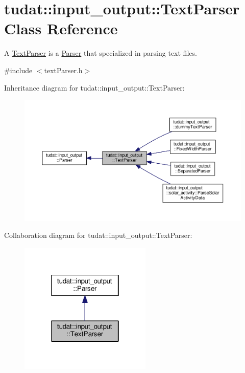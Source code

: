 \hypertarget{classtudat_1_1input__output_1_1TextParser}{}\section{tudat\+:\+:input\+\_\+output\+:\+:Text\+Parser Class Reference}
\label{classtudat_1_1input__output_1_1TextParser}


A \hyperlink{classtudat_1_1input__output_1_1TextParser}{Text\+Parser} is a \hyperlink{classtudat_1_1input__output_1_1Parser}{Parser} that specialized in parsing text files.  




{\ttfamily \#include $<$text\+Parser.\+h$>$}



Inheritance diagram for tudat\+:\+:input\+\_\+output\+:\+:Text\+Parser\+:
\nopagebreak
\begin{figure}[H]
\begin{center}
\leavevmode
\includegraphics[width=350pt]{classtudat_1_1input__output_1_1TextParser__inherit__graph}
\end{center}
\end{figure}


Collaboration diagram for tudat\+:\+:input\+\_\+output\+:\+:Text\+Parser\+:
\nopagebreak
\begin{figure}[H]
\begin{center}
\leavevmode
\includegraphics[width=178pt]{classtudat_1_1input__output_1_1TextParser__coll__graph}
\end{center}
\end{figure}
